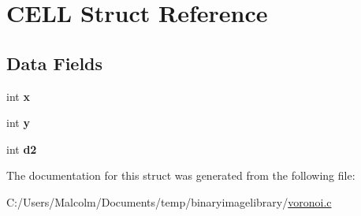 \hypertarget{struct_c_e_l_l}{}\section{C\+E\+LL Struct Reference}
\label{struct_c_e_l_l}
\subsection*{Data Fields}
\begin{DoxyCompactItemize}
\item 
int {\bfseries x}\hypertarget{struct_c_e_l_l_a7ada1bd1b65cd4c6ec69fead0cdece9a}{}\label{struct_c_e_l_l_a7ada1bd1b65cd4c6ec69fead0cdece9a}

\item 
int {\bfseries y}\hypertarget{struct_c_e_l_l_a899af2d554b46953ccd3e644057959ff}{}\label{struct_c_e_l_l_a899af2d554b46953ccd3e644057959ff}

\item 
int {\bfseries d2}\hypertarget{struct_c_e_l_l_a825650dd404b200ba0916dd97c51f658}{}\label{struct_c_e_l_l_a825650dd404b200ba0916dd97c51f658}

\end{DoxyCompactItemize}


The documentation for this struct was generated from the following file\+:\begin{DoxyCompactItemize}
\item 
C\+:/\+Users/\+Malcolm/\+Documents/temp/binaryimagelibrary/\hyperlink{voronoi_8c}{voronoi.\+c}\end{DoxyCompactItemize}
